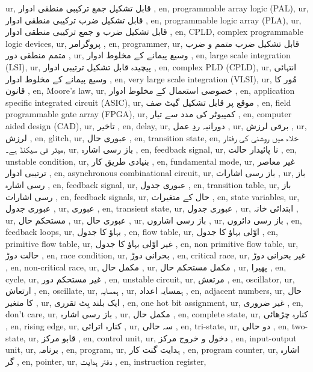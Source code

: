 ur,  قابل تشکیل جمع ترکیبی منطقی ادوار  ,
en, programmable array logic (PAL),
ur,  قابل تشکیل ضرب ترکیبی منطقی ادوار  ,
en, programmable logic array (PLA),
ur,  قابل تشکیل ضرب و جمع ترکیبی منطقی ادوار  ,
en, CPLD, complex programmable logic devices,
ur,  پروگرامر  ,
en, programmer,
ur,  قابل تشکیل ضرب متمم و ضرب متمم منطقی دور ,
ur,  وسیع پیمانے کے مخلوط ادوار ,
en, large scale integration (LSI),
ur, پیچیدہ قابل تشکیل ترتیبی ادوار  ,
en, complex PLD (CPLD),
ur, انتہائی وسیع پیمانے کے مخلوط ادوار  ,
en, very large scale integration (VLSI),
ur,  مُور کا قانون  ,
en, Moore's law,
ur,  خصوصی استعمال کے مخلوط ادوار  ,
en, application specific integrated circuit (ASIC),
ur,  موقع پر قابل تشکیل گیٹ صف  ,
en, field programmable gate array (FPGA),
ur, کمپیوٹر کی مدد سے تیار  ,
en, computer aided design (CAD),
ur,  تاخیر  ,
en, delay,
ur, دورانیہ ردِ عمل  ,
ur,  برقی لرزش ,
ur,  لرزش ,
en, glitch,
ur, عبوری حال  ,
en, transition state,
en, خلاء میں روشنی کی رفتار  میٹر فی سیکنڈ ہے۔,
ur,  باز رسی اشارہ  ,
en, feedback signal,
ur,  نا پائیدار حالت  ,
en, unstable condition,
ur, بنیادی طریق کار  ,
en, fundamental mode,
ur, غیر معاصر ترتیبی ادوار  ,
en, asynchronous combinational circuit,
ur,  باز رسی اشارات  ,
ur, باز رسی اشارہ  ,
en, feedback signal,
ur,  عبوری جدول  ,
en, transition table,
ur, باز رسی اشارات ,
en, feedback signals,
ur, حال کے متغیرات ,
en, state variables,
ur, عبوری جدول  ,
ur, عبوری  ,
en, transient state,
ur, عبوری جدول  ,
ur, ابتدائی خانہ ,
ur,  مستحکم حال  ,
ur,  عبوری حال  ,
ur, باز رسی اشاروں  ,
ur, باز رسی دائروں  ,
en, feedback loops,
ur,  بہاؤ کا جدول  ,
en, flow table,
ur,  اوّلی بہاؤ کا جدول  ,
en, primitive flow table,
ur,  غیر اوّلی بہاؤ کا جدول  ,
en, non primitive flow table,
ur, حالت دوڑ  ,
en, race condition,
ur, بحرانی دوڑ  ,
en, critical race,
ur,  غیر بحرانی دوڑ  ,
en, non-critical race,
ur, مکمل حال  ,
ur,  مکمل مستحکم حال  ,
ur,  پھیرا  ,
en, cycle,
ur, غیر مستحکم دور  ,
en, unstable circuit,
ur,  مرتعش  ,
en, oscillator,
ur, ارتعاش  ,
en, oscillate,
ur, ہمسایہ  ,
ur,  ہمسایہ اعداد  ,
en, adjacent numbers,
ur,  حال کا متغیر  ,
ur, ایک بلند بِٹ تقرری  ,
en, one hot bit assignment,
ur,  غیر ضروری  ,
en, don't care,
ur,  باز رسی اشارہ  ,
ur, مکمل حال  ,
en, complete state,
ur, کنارہ چڑھائی  ,
en, rising edge,
ur,  کنارہ اترائی  ,
ur, سہ حالی ,
en, tri-state,
ur,  دو حالی  ,
en, two-state,
ur,  قابو مرکز  ,
en, control unit,
ur,  دخول و خروج مرکز  ,
en, input-output unit,
ur,  برنامہ  ,
en, program,
ur,  ہدایت گنت کار  ,
en, program counter,
ur,  اشارہ گر  ,
en, pointer,
ur, دفتر ہدایت  ,
en, instruction register,
